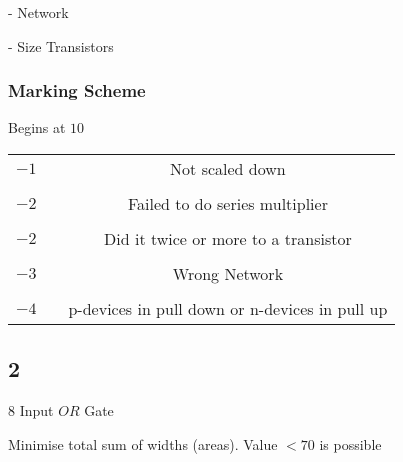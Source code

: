 \documentclass[a4paper,12pt]{article}
\begin{document}
\indent - Network

\indent - Size Transistors

\begin{table}[hbtp]


\caption{$F_{1} = \overline{A \cdot \left( B + C \right) }$}

\end{table}


\begin{table}[hbtp]


\caption{$F_{2} = \overline{A \cdot \left( B + C \cdot D \right) }$}

\end{table}

\subsubsection*{Marking Scheme}

Begins at $10$

\begin{tabular}{ccc}
$-1$	&	\hspace{10mm}	&	Not scaled down											\\
		&						&																	\\
$-2$	&	\hspace{10mm}	&	Failed to do series multiplier						\\
		&						&																	\\
$-2$	&	\hspace{10mm}	&	Did it twice or more to a transistor				\\
		&						&																	\\
$-3$	&	\hspace{10mm}	&	Wrong Network												\\
		&						&																	\\
$-4$	&	\hspace{10mm}	&	p-devices in pull down or n-devices in pull up	\\
\end{tabular}

\subsection*{2}

$8$ Input $OR$ Gate

Minimise total sum of widths (areas). Value $< 70$ is possible


\begin{table}[hbtp]


\end{table}


\begin{table}[hbtp]


\end{table}
\end{document}
